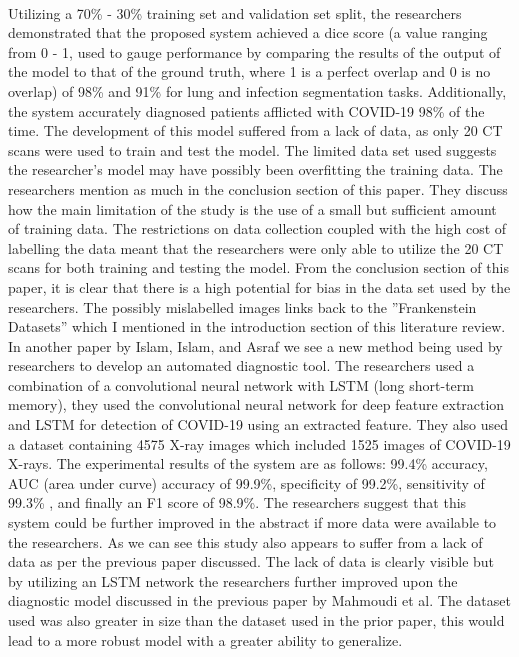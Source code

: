 \\
Utilizing a 70\% - 30\% training set and validation set split, the researchers demonstrated that the proposed system achieved a dice score (a value ranging from 0 - 1, used to gauge performance by comparing the results of the output of the model to that of the ground truth, where 1 is a perfect overlap and 0 is no overlap) of 98\% and 91\% for lung and infection segmentation tasks.  Additionally, the system accurately diagnosed patients afflicted with COVID-19 98\% of the time.  The development of this model suffered from a lack of data, as only 20 CT scans were used to train and test the model. The limited data set used suggests the researcher's model may have possibly been overfitting the training data.  The researchers mention as much in the conclusion section of this paper. They discuss how the main limitation of the study is the use of a small but sufficient amount of training data.  The restrictions on data collection coupled with the high cost of labelling the data meant that the researchers were only able to utilize the 20 CT scans for both training and testing the model. From the conclusion section of this paper, it is clear that there is a high potential for bias in the data set used by the researchers.  The possibly mislabelled images links back to the ''Frankenstein Datasets'' which I mentioned in the introduction section of this literature review.
\\
In another paper by Islam, Islam, and Asraf\cite{litReviewCnnLstm} we see a new method being used by researchers to develop an automated diagnostic tool.  The researchers used a combination of a convolutional neural network with LSTM (long short-term memory), they used the convolutional neural network for deep feature extraction and LSTM for detection of COVID-19 using an extracted feature.  They also used a dataset containing 4575 X-ray images which included 1525 images of COVID-19 X-rays.  The experimental results of the system are as follows: 99.4\% accuracy, AUC (area under curve) accuracy of 99.9\%, specificity of 99.2\%, sensitivity of 99.3\% , and finally an F1 score of 98.9\%.  The researchers suggest that this system could be further improved in the abstract if more data were available to the researchers.  As we can see this study also appears to suffer from a lack of data as per the previous paper discussed.  The lack of data is clearly visible but by utilizing an LSTM network the researchers further improved upon the diagnostic model discussed in the previous paper by Mahmoudi et al.  The dataset used was also greater in size than the dataset used in the prior paper, this would lead to a more robust model with a greater ability to generalize.
